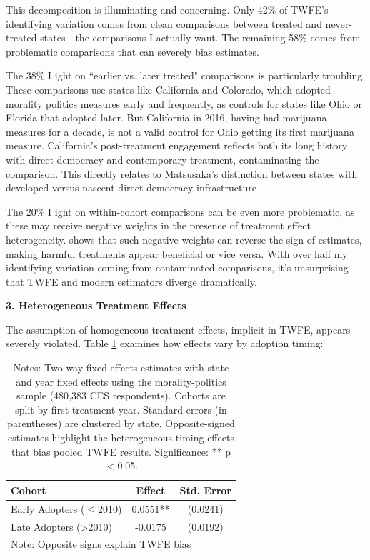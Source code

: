 \documentclass[12pt,letterpaper,oneside]{book}
\begin{document}
This decomposition is illuminating and concerning. Only 42\% of TWFE's identifying variation comes from clean comparisons between treated and never-treated states---the comparisons I actually want. The remaining 58\% comes from problematic comparisons that can severely bias estimates.

The 38\% I ight on ``earlier vs. later treated" comparisons is particularly troubling. These comparisons use states like California and Colorado, which adopted morality politics measures early and frequently, as controls for states like Ohio or Florida that adopted later. But California in 2016, having had marijuana measures for a decade, is not a valid control for Ohio getting its first marijuana measure. California's post-treatment engagement reflects both its long history with direct democracy and contemporary treatment, contaminating the comparison. This directly relates to Matsusaka's distinction between states with developed versus nascent direct democracy infrastructure \citep{matsusaka2018public}.

The 20\% I ight on within-cohort comparisons can be even more problematic, as these may receive negative weights in the presence of treatment effect heterogeneity. \citet{de2020two} shows that such negative weights can reverse the sign of estimates, making harmful treatments appear beneficial or vice versa. With over half my identifying variation coming from contaminated comparisons, it's unsurprising that TWFE and modern estimators diverge dramatically.

\textbf{3. Heterogeneous Treatment Effects}

The assumption of homogeneous treatment effects, implicit in TWFE, appears severely violated. Table \ref{tab:timing_heterogeneity} examines how effects vary by adoption timing:

\begin{table}[H]
\centering
\caption{Heterogeneous Effects by Treatment Adoption Timing}
\label{tab:timing_heterogeneity}
\caption*{\footnotesize Notes: Two-way fixed effects estimates with state and year fixed effects using the morality-politics sample (480{,}383 CES respondents). Cohorts are split by first treatment year. Standard errors (in parentheses) are clustered by state. Opposite-signed estimates highlight the heterogeneous timing effects that bias pooled TWFE results. Significance: ** p$<$0.05.}
\begin{tabular}{lcc}
\hline\hline
Cohort & Effect & Std. Error \\
\hline
Early Adopters ($\leq$2010) & 0.0551** & (0.0241) \\
Late Adopters (>2010) & -0.0175 & (0.0192) \\
\hline
\multicolumn{3}{l}{\footnotesize Note: Opposite signs explain TWFE bias} \\
\hline\hline
\end{tabular}
\end{table}
\end{document}
